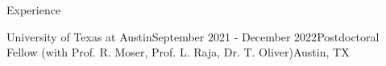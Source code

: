 \documentclass{resume} %
\begin{document}
\begin{rSection}{Experience}
\begin{rSubsection}{University of Texas at Austin}{September 2021 - December 2022}{Postdoctoral Fellow \textnormal{(with Prof. R. Moser, Prof. L. Raja, Dr. T. Oliver)}}{Austin, TX}
\item[]
\vspace{-20pt}
\end{rSubsection}


\end{rSection}
\end{document}
